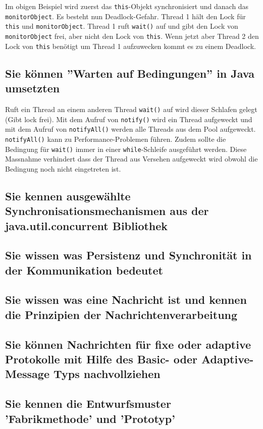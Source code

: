 Im obigen Beispiel wird zuerst das \verb|this|-Objekt synchronisiert und danach das \verb|monitorObject|. Es besteht nun Deadlock-Gefahr. Thread 1 hält den Lock für \verb|this| und \verb|monitorObject|. Thread 1 ruft \verb|wait()| auf und gibt den Lock von \verb|monitorObject| frei, aber nicht den Lock von \verb|this|. Wenn jetzt aber Thread 2 den Lock von \verb|this| benötigt um Thread 1 aufzuwecken kommt es zu einem Deadlock.


\subsection{Sie können ''Warten auf Bedingungen'' in Java umsetzten}

Ruft ein Thread an einem anderen Thread \verb|wait()| auf wird dieser Schlafen gelegt (Gibt lock frei). Mit dem Aufruf von \verb|notify()| wird ein Thread aufgeweckt und mit dem Aufruf von \verb|notifyAll()| werden alle Threads aus dem Pool aufgeweckt. \verb|notifyAll()| kann zu Performance-Problemen führen. Zudem sollte die Bedingung für \verb|wait()| immer in einer \verb|while|-Schleife ausgeführt werden. Diese Massnahme verhindert dass der Thread aus Versehen aufgeweckt wird obwohl die Bedingung noch nicht eingetreten ist. 

\subsection{Sie kennen ausgewählte Synchronisationsmechanismen aus der java.util.concurrent Bibliothek}
\subsection{Sie wissen was Persistenz und Synchronität in der Kommunikation bedeutet}
\subsection{Sie wissen was eine Nachricht ist und kennen die Prinzipien der Nachrichtenverarbeitung}
\subsection{Sie können Nachrichten für fixe oder adaptive Protokolle mit Hilfe des Basic- oder Adaptive-Message Typs nachvollziehen}
\subsection{Sie kennen die Entwurfsmuster 'Fabrikmethode' und 'Prototyp'}
